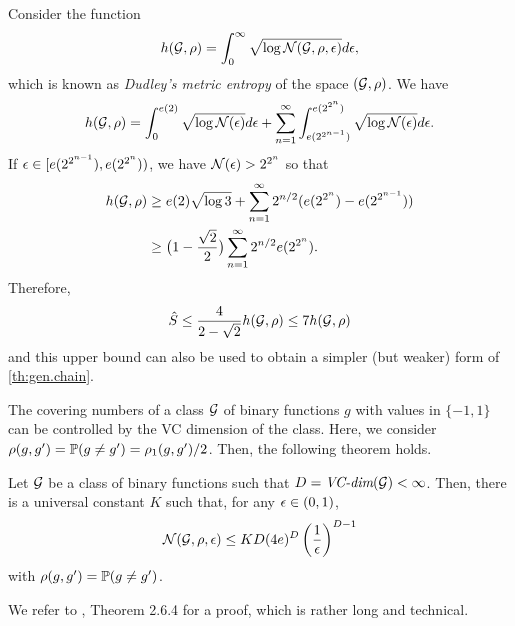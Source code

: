 Consider the function
\begin{equation}
\label{eq:met.ent}
h({\mathcal G}, \rho) = \int_0^\infty \sqrt{\log {\mathcal N}({\mathcal G}, \rho, \epsilon)} d\epsilon ,
\end{equation}
which is known as {\em Dudley's metric entropy} of the space $({\mathcal G}, \rho)$.
We have 
\[
h({\mathcal G}, \rho) = \int_0^{e(2)} \sqrt{\log {\mathcal N}(\epsilon)} d\epsilon +  \sum_{n=1}^\infty \int_{e(2^{2^{n-1}})}^{e(2^{2^n})} \sqrt{\log {\mathcal N}(\epsilon)} d\epsilon .
\]
If $\epsilon \in [e(2^{2^{n-1}}), e(2^{2^n}))$, we have ${\mathcal N}(\epsilon) > 2^{2^n}$ so that 
\begin{align*}
h({\mathcal G}, \rho) &\geq e(2) \sqrt{\log 3} + \sum_{n=1}^\infty 2^{n/2} (e(2^{2^n}) - e(2^{2^{n-1}})) \\
&\geq \big(1 - \frac{\sqrt2}2\big) \sum_{n=1}^\infty 2^{n/2} e(2^{2^n}).
\end{align*}
Therefore,
\[
\hat S \leq \frac{4}{2-\sqrt2} h({\mathcal G}, \rho) \leq 7 h({\mathcal G}, \rho)
\]
and this upper bound can also be used to obtain a simpler (but weaker) form of  \cref{th:gen.chain}.

\begin{remark}
\label{rem:entropy.vc}
The covering numbers of a class ${\mathcal G}$ of binary functions $g$ with values in $\{-1, 1\}$ can be controlled by the VC dimension of the class. Here, we consider $\rho(g,g') = \bm{\mathbb P}(g\neq g') = \rho_1(g,g')/2$. Then, the following theorem holds.
\begin{theorem}
\label{th:vc.entropy}
Let ${\mathcal G}$ be a class of binary functions such that $D = \textit{VC-dim}({\mathcal G})< \infty$. Then, there is a universal constant $K$ such that, for any $\epsilon \in (0,1)$,
\[
{\mathcal N}({\mathcal G}, \rho, \epsilon) \leq KD(4e)^D \left(\frac1{\epsilon}\right)^{D-1}
\]
with $\rho(g,g') = \bm{\mathbb P}(g\neq g')$.
\end{theorem}
We refer to \citet{vander1996Weak}, Theorem 2.6.4 for a proof, which is rather long and technical. 
\end{remark}

